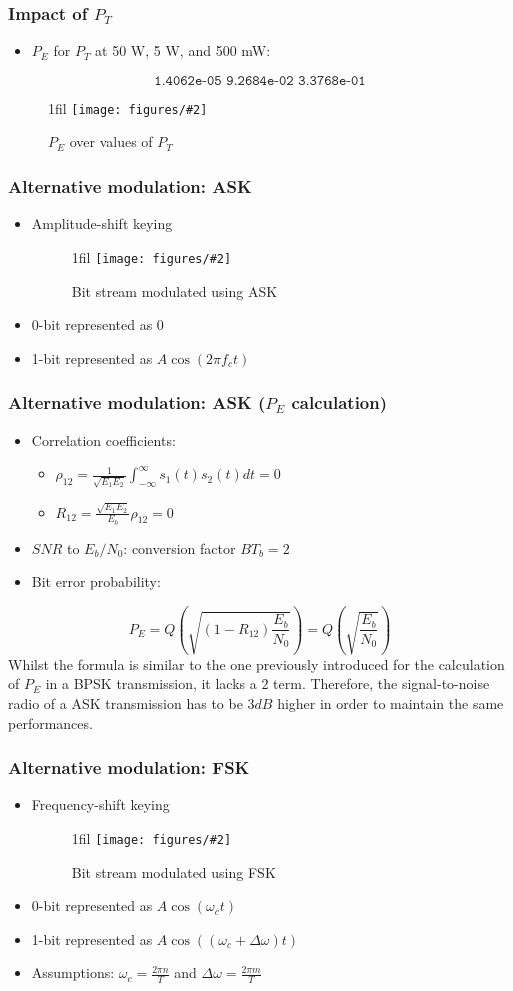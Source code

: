 \documentclass{beamer}
\makeatletter
\newcommand{\code}[1]{\texttt{#1}}
\newcommand*{\centerfloat}{%
  \parindent \z@
  \leftskip \z@ \@plus 1fil \@minus \textwidth
  \rightskip\leftskip
  \parfillskip \z@skip}
\newcommand{\fig}[3]{
  \begin{figure}[H]
  \centerfloat
    \texttt{[image: figures/\#2]}
    \caption{#3}
  \end{figure}
}
\makeatother
\begin{document}
\begin{frame}
	\frametitle{Impact of $P_T$}
	\begin{itemize}
		\item $P_E$ for $P_T$ at 50 W, 5 W, and 500 mW:
	\end{itemize}
	\begin{equation}
		\code{1.4062e-05   9.2684e-02   3.3768e-01}
	\end{equation}
	\fig{4cm}{pe_over_pt.png}{$P_E$ over values of $P_T$}
\end{frame}

\begin{frame}
	\frametitle{Alternative modulation: ASK}
	\begin{itemize}
		\item Amplitude-shift keying
		\fig{2.5cm}{ask.png}{Bit stream modulated using ASK}
		\item 0-bit represented as 0
		\item 1-bit represented as $A\cos(2 \pi f_c t)$
	\end{itemize}
\end{frame}

\begin{frame}
	\frametitle{Alternative modulation: ASK ($P_E$ calculation)}
	\begin{itemize}
		\item Correlation coefficients:
		\begin{itemize}
			\item $\rho_{12} = \frac{1}{\sqrt{E_1 E_2}} \int_{-\infty}^{\infty} s_1(t) s_2(t) dt = 0$
			\item $R_{12} = \frac{\sqrt{E_1 E_2}}{E_b}\rho_{12} = 0$
		\end{itemize}
		\item $SNR$ to $E_b/N_0$: conversion factor $B T_b = 2$
		\item Bit error probability:
	\end{itemize}
	\begin{equation}
		P_E = Q\left(\sqrt{\left(1 - R_{12}\right) \frac{E_b}{N_0}}\right) = Q\left(\sqrt{\frac{E_b}{N_0}}\right)
	\end{equation}
Whilst the formula is similar to the one previously introduced for the
calculation of $P_E$ in a BPSK transmission, it lacks a $2$ term. Therefore, the signal-to-noise radio of a ASK transmission has to be $3 dB$ higher in order to maintain the same performances.
\end{frame}

\begin{frame}
	\frametitle{Alternative modulation: FSK}
	\begin{itemize}
		\item Frequency-shift keying
		\fig{2.5cm}{fsk.png}{Bit stream modulated using FSK}
		\item 0-bit represented as $A\cos(\omega_c t)$
		\item 1-bit represented as $A\cos((\omega_c + \Delta \omega) t)$
		\item Assumptions: $\omega_c = \frac{2 \pi n}{T}$ and $\Delta\omega = \frac{2 \pi m}{T}$
	\end{itemize}
\end{frame}
\end{document}

